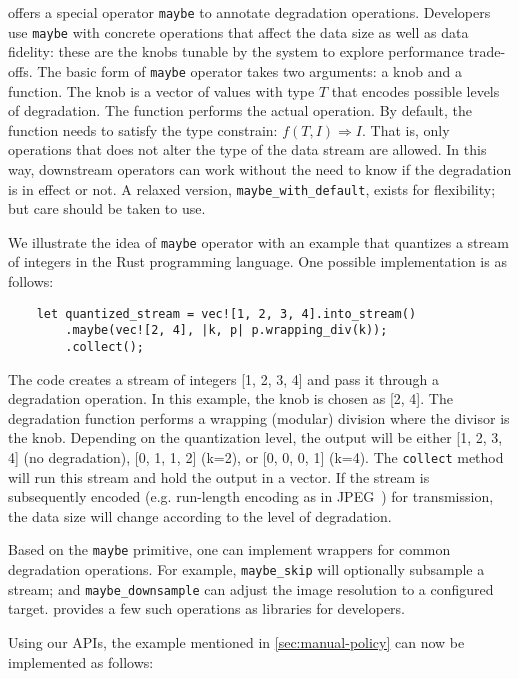 \sysname{} offers a special operator \texttt{maybe} to annotate degradation
operations. Developers use \texttt{maybe} with concrete operations that affect
the data size as well as data fidelity: these are the knobs tunable by the
system to explore performance trade-offs. The basic form of \texttt{maybe}
operator takes two arguments: a knob and a function. The knob is a vector of
values with type $T$ that encodes possible levels of degradation. The function
performs the actual operation. By default, the function needs to satisfy the
type constrain: $f(T, I) \Rightarrow I$. That is, only operations that does not
alter the type of the data stream are allowed. In this way, downstream operators
can work without the need to know if the degradation is in effect or not. A
relaxed version, \texttt{maybe\_with\_default}, exists for flexibility; but care
should be taken to use.

We illustrate the idea of \texttt{maybe} operator with an example that quantizes
a stream of integers in the Rust programming language. One possible
implementation is as follows:

\vspace{-2pt}
\begin{lstlisting}
    let quantized_stream = vec![1, 2, 3, 4].into_stream()
        .maybe(vec![2, 4], |k, p| p.wrapping_div(k));
        .collect();
\end{lstlisting}

The code creates a stream of integers [1, 2, 3, 4] and pass it through a
degradation operation. In this example, the knob is chosen as [2, 4]. The
degradation function performs a wrapping (modular) division where the divisor is
the knob. Depending on the quantization level, the output will be either [1, 2,
3, 4] (no degradation), [0, 1, 1, 2] (k=2), or [0, 0, 0, 1] (k=4). The
\texttt{collect} method will run this stream and hold the output in a vector.
If the stream is subsequently encoded (e.g. run-length encoding as in
JPEG~\cite{wallace1992jpeg}) for transmission, the data size will change
according to the level of degradation.

Based on the \texttt{maybe} primitive, one can implement wrappers for common
degradation operations. For example, \texttt{maybe\_skip} will optionally
subsample a stream; and \texttt{maybe\_downsample} can adjust the image
resolution to a configured target. \sysname{} provides a few such operations as
libraries for developers.

Using our APIs, the example mentioned in \autoref{sec:manual-policy} can now be
implemented as follows:

